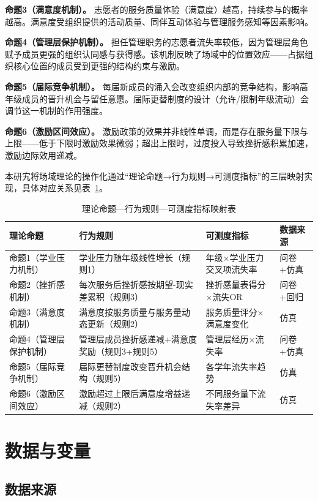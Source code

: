 \documentclass[12pt,a4paper]{article}
\begin{document}
\textbf{命题3（满意度机制）。} 志愿者的服务质量体验（满意度）越高，持续参与的概率越高。满意度受组织提供的活动质量、同伴互动体验与管理服务感知等因素影响。

\textbf{命题4（管理层保护机制）。} 担任管理职务的志愿者流失率较低，因为管理层角色赋予成员更强的组织认同感与获得感。该机制反映了场域中的位置效应——占据组织核心位置的成员受到更强的结构约束与激励。

\textbf{命题5（届际竞争机制）。} 每届新成员的涌入会改变组织内部的竞争结构，影响高年级成员的晋升机会与留任意愿。届际更替制度的设计（允许/限制年级流动）会调节这一机制的作用强度。

\textbf{命题6（激励区间效应）。} 激励政策的效果并非线性单调，而是存在服务量下限与上限——低于下限时激励效果微弱；超出上限时，过度投入导致挫折感积累加速，激励边际效用递减。


本研宄将场域理论的操作化通过“理论命题→行为规则→可测度指标”的三层映射实现，具体对应关系见表~\ref{tab:theory_map}。

\begin{table}[H]
\centering
\caption{理论命题—行为规则—可测度指标映射表}
\label{tab:theory_map}
\begin{tabular}{p{3cm}p{4.5cm}p{4cm}p{2cm}}
\toprule
理论命题 & 行为规则 & 可测度指标 & 数据来源 \\
\midrule
命题1（学业压力机制） & 学业压力随年级线性增长（规则1） & 年级×学业压力交叉项流失率 & 问卷+仿真 \\
命题2（挫折感机制） & 每次服务后挫折感按期望-现实差累积（规则3） & 挫折感量表得分×流失OR & 问卷+回归 \\
命题3（满意度机制） & 满意度按服务质量与服务量动态更新（规则2） & 服务质量评分×满意度变化 & 仿真 \\
命题4（管理层保护机制） & 管理层成员挫折感递减+满意度奖励（规则3+规则5） & 管理层经历×流失率 & 问卷+仿真 \\
命题5（届际竞争机制） & 届际更替制度改变晋升机会结构（规则5） & 各学年流失率趋势 & 仿真 \\
命题6（激励区间效应） & 激励超过上限后满意度增益递减（规则2） & 不同服务量下流失率差异 & 仿真 \\
\bottomrule
\end{tabular}
\end{table}

\section{数据与变量}

\subsection{数据来源}
\end{document}
